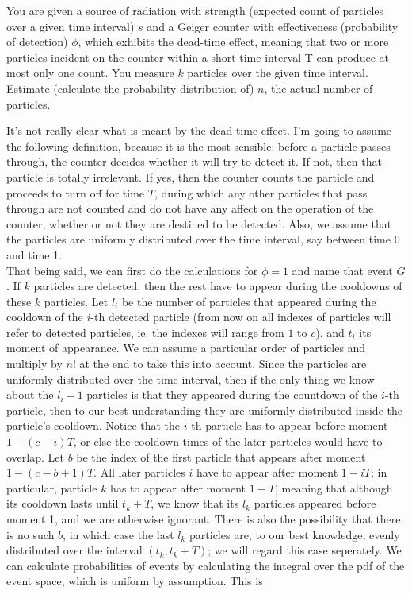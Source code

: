 \documentclass{note}
\begin{document}
\begin{exercise}{6.5}
You are given a source of radiation with strength (expected count of particles over a given time interval) $s$ and a Geiger counter with effectiveness (probability of detection) $\phi$, which exhibits the dead-time effect, meaning that two or more particles incident on the counter within a short time interval T can produce at most only one count. You measure $k$ particles over the given time interval. Estimate (calculate the probability distribution of) $n$, the actual number of particles.
\end{exercise}

\begin{solution}
It's not really clear what is meant by the dead-time effect. I'm going to assume the following definition, because it is the most sensible: before a particle passes through, the counter decides whether it will try to detect it. If not, then that particle is totally irrelevant. If yes, then the counter counts the particle and proceeds to turn off for time $T$, during which any other particles that pass through are not counted and do not have any affect on the operation of the counter, whether or not they are destined to be detected. Also, we assume that the particles are uniformly distributed over the time interval, say between time 0 and time 1.\\
That being said, we can first do the calculations for $\phi = 1$ and name that event $G$. If $k$ particles are detected, then the rest have to appear during the cooldowns of these $k$ particles. Let $l_i$ be the number of particles that appeared during the cooldown of the $i$-th detected particle (from now on all indexes of particles will refer to detected particles, ie. the indexes will range from $1$ to $c$), and $t_i$ its moment of appearance. We can assume a particular order of particles and multiply by $n!$ at the end to take this into account. Since the particles are uniformly distributed over the time interval, then if the only thing we know about the $l_i - 1$ particles is that they appeared during the countdown of the $i$-th particle, then to our best understanding they are uniformly distributed inside the particle's cooldown. Notice that the $i$-th particle has to appear before moment $1 - (c - i)T$, or else the cooldown times of the later particles would have to overlap. Let $b$ be the index of the first particle that appears after moment $1 - (c - b + 1)T$. All later particles $i$ have to appear after moment $1 - iT$; in particular, particle $k$ has to appear after moment $1 - T$, meaning that although its cooldown lasts until $t_k + T$, we know that its $l_k$ particles appeared before moment 1, and we are otherwise ignorant. There is also the possibility that there is no such $b$, in which case the last $l_k$ particles are, to our best knowledge, evenly distributed over the interval $(t_k, t_k + T)$; we will regard this case seperately. We can calculate probabilities of events by calculating the integral over the pdf of the event space, which is uniform by assumption. This is


\end{solution}
\end{document}
